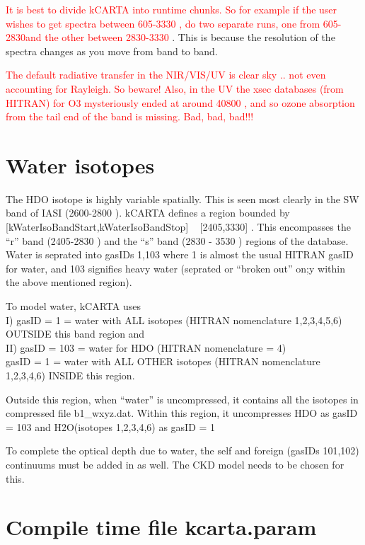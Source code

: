 \documentclass[12pt]{article}
\newcommand{\kc}{\textsf{kCARTA}\xspace}
\begin{document}
\textcolor{red}{It is best to divide \kc into runtime chunks. So for example if
the user wishes to get spectra between 605-3330 \wn, do two separate runs, one
from 605-2830\wn and the other between 2830-3330 \wn}. This is because the
resolution of the spectra changes as you move from band to band.

\textcolor{red}{The default radiative transfer in the NIR/VIS/UV is clear 
sky .. not even accounting for Rayleigh. So beware! Also, in the UV the xsec
databases (from HITRAN) for O3 mysteriously ended at around 40800 \wn, and so 
ozone absorption from the tail end of the band is missing. Bad, bad, bad!!!}

\section{Water isotopes}
The HDO isotope is highly variable spatially. This is seen most clearly in the
SW band of IASI (2600-2800 \wn). \kc defines a region  bounded by 
[kWaterIsoBandStart,kWaterIsoBandStop] ~ [2405,3330] \wn. This encompasses the 
``r'' band (2405-2830 \wn) and the ``s'' band (2830 - 3530 \wn) regions of the 
database. Water is seprated into gasIDs 1,103 where 1 is almost the usual HITRAN
gasID for water, and 103 signifies heavy water (seprated or ``broken out'' on;y
within the above mentioned region).

To model water, kCARTA uses \\
I) gasID = 1 = water with ALL isotopes (HITRAN  nomenclature 1,2,3,4,5,6)
OUTSIDE this band region and \\
II) gasID = 103 = water for HDO (HITRAN nomenclature = 4) \\
gasID = 1 = water with ALL OTHER isotopes (HITRAN  nomenclature 1,2,3,4,6)
INSIDE this region.

Outside this region, when ``water'' is uncompressed, it contains all the 
isotopes in compressed file b1\_wxyz.dat. Within this region, it uncompresses
HDO as gasID = 103 and H2O(isotopes 1,2,3,4,6) as gasID = 1

To complete the optical depth due to water, the self and foreign (gasIDs 101,102)
continuums must be added in as well. The CKD model needs to be chosen for this.

\section{Compile time file {\sf kcarta.param}}
\end{document}
